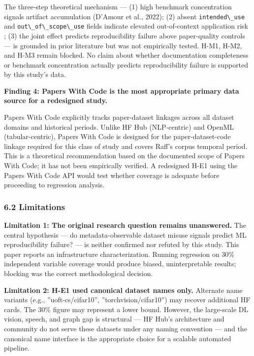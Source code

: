 The three-step theoretical mechanism --- (1) high benchmark concentration signals artifact accumulation (D'Amour et al., 2022); (2) absent \texttt{intended\textbackslash \_use} and \texttt{out\textbackslash \_of\textbackslash \_scope\textbackslash \_use} fields indicate elevated out-of-context application risk \citep{Gebru2021Datasheets}; (3) the joint effect predicts reproducibility failure above paper-quality controls --- is grounded in prior literature but was not empirically tested. H-M1, H-M2, and H-M3 remain blocked. No claim about whether documentation completeness or benchmark concentration actually predicts reproducibility failure is supported by this study's data.

\textbf{Finding 4: Papers With Code is the most appropriate primary data source for a redesigned study.}

Papers With Code explicitly tracks paper-dataset linkages across all dataset domains and historical periods. Unlike HF Hub (NLP-centric) and OpenML (tabular-centric), Papers With Code is designed for the paper-dataset-code linkage required for this class of study and covers Raff's corpus temporal period. This is a theoretical recommendation based on the documented scope of Papers With Code; it has not been empirically verified. A redesigned H-E1 using the Papers With Code API would test whether coverage is adequate before proceeding to regression analysis.

\subsubsection{6.2 Limitations}

\textbf{Limitation 1: The original research question remains unanswered.} The central hypothesis --- do metadata-observable dataset misuse signals predict ML reproducibility failure? --- is neither confirmed nor refuted by this study. This paper reports an infrastructure characterization. Running regression on 30\% independent variable coverage would produce biased, uninterpretable results; blocking was the correct methodological decision.

\textbf{Limitation 2: H-E1 used canonical dataset names only.} Alternate name variants (e.g., ''uoft-cs/cifar10'', ''torchvision/cifar10'') may recover additional HF cards. The 30\% figure may represent a lower bound. However, the large-scale DL vision, speech, and graph gap is structural --- HF Hub's architecture and community do not serve these datasets under any naming convention --- and the canonical name interface is the appropriate choice for a scalable automated pipeline.

